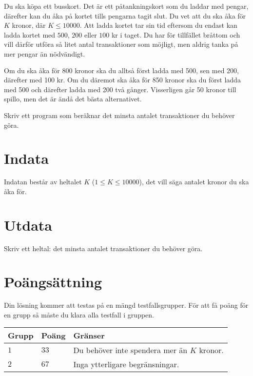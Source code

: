 Du ska köpa ett busskort. Det är ett påtankningskort som du laddar med pengar, därefter kan du åka på kortet tills pengarna tagit slut. Du vet att du ska åka för $K$ kronor, där $K \leq 10000$. Att ladda kortet tar sin tid eftersom du endast kan ladda kortet med $500$, $200$ eller $100$ kr i taget. Du har för tillfället bråttom och vill därför utföra så litet antal transaktioner som möjligt, men aldrig tanka på mer pengar än nödvändigt.

Om du ska åka för 800 kronor ska du alltså först ladda med 500, sen med 200, därefter med 100 kr. Om du däremot ska åka för 850 kronor ska du först ladda med 500 och därefter ladda med 200 två gånger. Visserligen går 50 kronor till spillo, men det är ändå det bästa alternativet.

Skriv ett program som beräknar det minsta antalet transaktioner du behöver göra.

\section*{Indata}
Indatan består av heltalet $K$ ($1 \leq K \leq 10000$), det vill säga antalet kronor du ska åka för.

\section*{Utdata}
Skriv ett heltal: det minsta antalet transaktioner du behöver göra.


\section*{Poängsättning}
Din lösning kommer att testas på en mängd testfallsgrupper.
För att få poäng för en grupp så måste du klara alla testfall i gruppen.

\noindent
\begin{tabular}{| l | l | p{12cm} |}
  \hline
  \textbf{Grupp} & \textbf{Poäng} & \textbf{Gränser} \\ \hline
  $1$    & $33$        & Du behöver inte spendera mer än $K$ kronor. \\ \hline 
  $2$    & $67$        & Inga ytterligare begränsningar. \\ \hline
\end{tabular}
